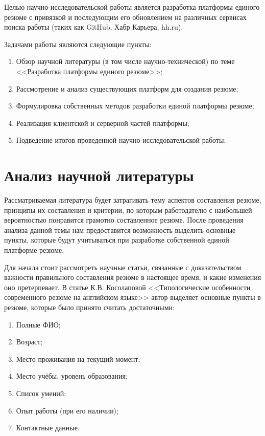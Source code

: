 \documentclass[master, och, coursework]{SCWorks}
\begin{document}
Целью научно-исследовательской работы является разработка платформы единого 
резюме с привязкой и последующим его обновлением на различных сервисах 
поиска работы (таких как GitHub, Хабр Карьера, hh.ru).

Задачами работы являются следующие пункты:
\begin{enumerate}
    \item Обзор научной литературы (в том числе научно-технической) по теме 
    <<Разработка платформы единого резюме>>;
    \item Рассмотрение и анализ существующих платформ для создания резюме;
    \item Формулировка собственных методов разработки единой платформы резюме;
    \item Реализация клиентской и серверной частей платформы;
    \item Подведение итогов проведенной научно-исследовательской работы.
\end{enumerate}


\newpage
\section{Анализ научной литературы}
Рассматриваемая литература будет затрагивать тему аспектов составления резюме, 
принципы их составления и критерии, по которым работодателю с наибольшей вероятностью 
понравится грамотно составленное резюме. После проведения анализа данной темы нам 
предоставится возможность выделить основные пункты, которые будут учитываться 
при разработке собственной единой платформе резюме.

Для начала стоит рассмотреть научные статьи, связанные с доказательством важности 
правильного составления резюме в настоящее время, и какие изменения  оно претерпевает. 
В статье К.В. Косолаповой <<Типологические особенности современного резюме на английском 
языке>> автор выделяет основные пункты в резюме, которые было принято считать достаточными:
\begin{enumerate}
    \item Полные ФИО;
    \item Возраст;
    \item Место проживания на текущий момент;
    \item Место учёбы, уровень образования;
    \item Список умений;
    \item Опыт работы (при его наличии);
    \item Контактные данные.
\end{enumerate}
\end{document}
